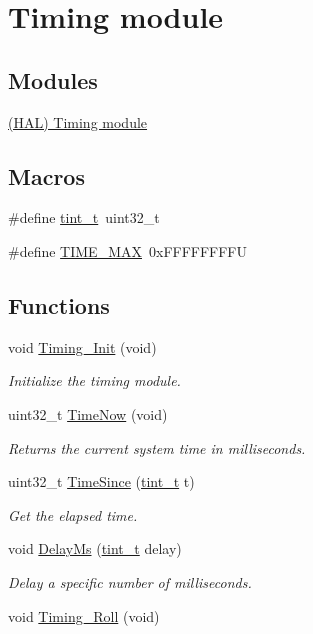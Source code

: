 \hypertarget{group__timing}{}\section{Timing module}
\label{group__timing}
\subsection*{Modules}
\begin{DoxyCompactItemize}
\item 
\hyperlink{group__hal__timing}{(\+H\+A\+L) Timing module}
\end{DoxyCompactItemize}
\subsection*{Macros}
\begin{DoxyCompactItemize}
\item 
\#define \hyperlink{group__timing_gaef97c9386393beb1be4ed0b1513ee481}{tint\+\_\+t}~uint32\+\_\+t
\item 
\#define \hyperlink{group__timing_ga0540485394df82add6b7c4f2137c7f21}{T\+I\+M\+E\+\_\+\+M\+A\+X}~0x\+F\+F\+F\+F\+F\+F\+F\+F\+U
\end{DoxyCompactItemize}
\subsection*{Functions}
\begin{DoxyCompactItemize}
\item 
void \hyperlink{group__timing_ga6a7bd5705bafa4dd205b38a13e50263c}{Timing\+\_\+\+Init} (void)
\begin{DoxyCompactList}\small\item\em Initialize the timing module. \end{DoxyCompactList}\item 
uint32\+\_\+t \hyperlink{group__timing_gad33d57773db985176e2722aeebfee9cc}{Time\+Now} (void)
\begin{DoxyCompactList}\small\item\em Returns the current system time in milliseconds. \end{DoxyCompactList}\item 
uint32\+\_\+t \hyperlink{group__timing_gaf31cb5a8f600695cd8bff12328aa65a9}{Time\+Since} (\hyperlink{group__timing_gaef97c9386393beb1be4ed0b1513ee481}{tint\+\_\+t} t)
\begin{DoxyCompactList}\small\item\em Get the elapsed time. \end{DoxyCompactList}\item 
void \hyperlink{group__timing_ga5a4bf9e6351a738abf338ceabdf4a095}{Delay\+Ms} (\hyperlink{group__timing_gaef97c9386393beb1be4ed0b1513ee481}{tint\+\_\+t} delay)
\begin{DoxyCompactList}\small\item\em Delay a specific number of milliseconds. \end{DoxyCompactList}\item 
void \hyperlink{group__timing_ga04f06155f2b1fa16cfa8046672048423}{Timing\+\_\+\+Roll} (void)
\end{DoxyCompactItemize}



